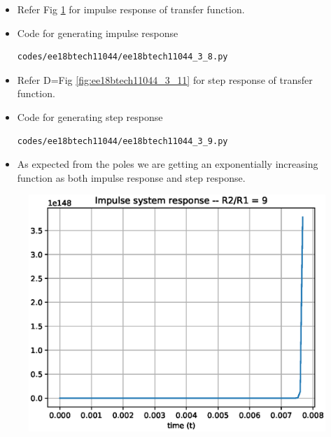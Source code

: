 \begin{enumerate}[label=\arabic*.,ref=\theenumi]
\begin{itemize}
\item Refer Fig \ref{fig:ee18btech11044_3_10} for impulse response of transfer function.
\item Code for generating impulse response
\begin{lstlisting}
codes/ee18btech11044/ee18btech11044_3_8.py
\end{lstlisting}
\item Refer D=Fig \ref{fig:ee18btech11044_3_11} for step response of transfer function.
\item Code for generating step response
\begin{lstlisting}
codes/ee18btech11044/ee18btech11044_3_9.py
\end{lstlisting}
\item As expected from the poles we are getting an exponentially increasing function as both impulse response and step response.
\end{itemize}

\begin{figure}[!ht]
\centering
\includegraphics[width=\columnwidth]{./figs/ee18btech11044/ee18btech11044_3_10.eps}
\caption{}
\label{fig:ee18btech11044_3_10}
\end{figure}


\end{enumerate}
